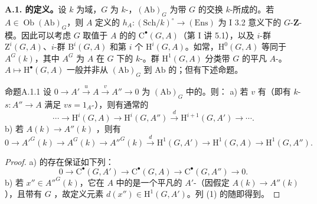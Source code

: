\textbf{A.1. 的定义。}设 $k$ 为域，$G$ 为 $k$-，$(\mathrm{Ab})_G$ 为带 $G$ 的交换 $k$-所成的。若 $A\in\operatorname{Ob}(\mathrm{Ab})_G$，则 $A$ 定义的 $h_A:(\mathrm{Sch}/k)^\circ\to(\mathrm{Ens})$ 为 I 3.2 意义下的 $G$-$\mathbf Z$-模。因此可以考虑 $G$ 取值于 $A$ 的的 $\mathrm C^\bullet(G,A)$（第 I 讲 5.1），以及 $i$-群 $\mathrm Z^i(G,A)$、$i$-群 $\mathrm B^i(G,A)$ 和第 $i$ 个 $\mathrm H^i(G,A)$。如常，$\mathrm H^0(G,A)$ 等同于 $A^G(k)$，其中 $A^G$ 为 $A$ 在 $G$ 下的 $k$-。群 $\mathrm H^1(G,A)$ 分类带 $G$ 的平凡 $A$-。
 $A\mapsto\mathrm H^\bullet(G,A)$ 一般并非从 $(\mathrm{Ab})_G$ 到 $\mathrm{Ab}$ 的；但有下述命题。
\begin{SGAresult}{命题}{A.1.1}
设 $0\to A'\xrightarrow u A\xrightarrow v A''\to0$ 为 $(\mathrm{Ab})_G$ 中的。则：
a) 若 $v$ 有（即有 $k$- $s:A''\to A$ 满足 $vs=1_{A''}$），则有通常的
\[\cdots\longrightarrow\mathrm H^i(G,A)\longrightarrow\mathrm H^i(G,A'')\xrightarrow d\mathrm H^{i+1}(G,A')\longrightarrow\cdots.\]
b) 若 $A(k)\to A''(k)$ ，则有
\[0\to A'^G(k)\to A^G(k)\to A''^G(k)\xrightarrow d\mathrm H^1(G,A')\to\mathrm H^1(G,A)\to\mathrm H^1(G,A'').\tag{1}\]
\end{SGAresult}
\begin{proof}
a) 的存在保证如下列：
\[0\longrightarrow\mathrm C^\bullet(G,A')\longrightarrow\mathrm C^\bullet(G,A)\longrightarrow\mathrm C^\bullet(G,A'')\longrightarrow0.\]
b) 若 $x''\in A''^G(k)$，它在 $A$ 中的是一个平凡的 $A'$-（因假定 $A(k)\to A''(k)$ ），且带有 $G$ ，故定义元素 $d(x'')\in\mathrm H^1(G,A')$。列 (1) 的随即得到。
\end{proof}

